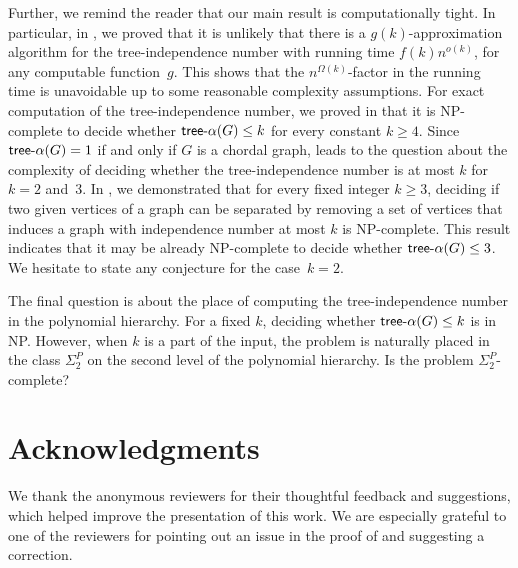\documentclass[11pt]{article}
\theoremstyle{definition}
\newcommand{\tin}{\mathsf{tree} \textnormal{-} \alpha}
\newcommand{\NP}{\textup{\textsf{NP}}}
\begin{document}
Further, we remind the reader that our main result is computationally tight. In particular, in , we proved
that it is unlikely that there is a $g(k)$-approximation algorithm for the tree-independence number with running time $f(k)n^{o(k)}$, for any computable function~$g$. This shows that the $n^{\Omega(k)}$-factor in the running time is unavoidable up to some reasonable complexity assumptions.
For exact computation of the tree-independence number, we proved in   that it is \NP-complete to decide whether $\tin(G)\leq k$ for every constant $k\geq 4$.
Since $\tin(G)=1$ if and only if $G$ is a chordal graph,  leads to the question about the complexity of deciding whether the tree-independence number is at most $k$ for $k=2$ and~$3$. In ,
we demonstrated that for every fixed integer $k\ge 3$, deciding if two given vertices of a graph can be separated by removing a set of vertices that induces a graph with independence number at most $k$ is \NP-complete. This result
indicates that  it may be already \NP-complete to decide whether $\tin(G)\leq 3$. We hesitate to state any conjecture for the case~$k=2$.

The final question is about the place of computing the tree-independence number in the polynomial hierarchy.
 For a fixed $k$, deciding whether $\tin(G)\leq k$ is in \NP.
However, when $k$ is a part of the input,  the problem is naturally placed in the class $\Sigma^P_2$ on the second level of the polynomial hierarchy.
Is the problem $\Sigma^P_2$-complete?

\section*{Acknowledgments}

We thank the anonymous reviewers for their thoughtful feedback and suggestions, which helped improve the presentation of this work. 
We are especially grateful to one of the reviewers for pointing out an issue in the proof of  and suggesting a correction.
\end{document}
